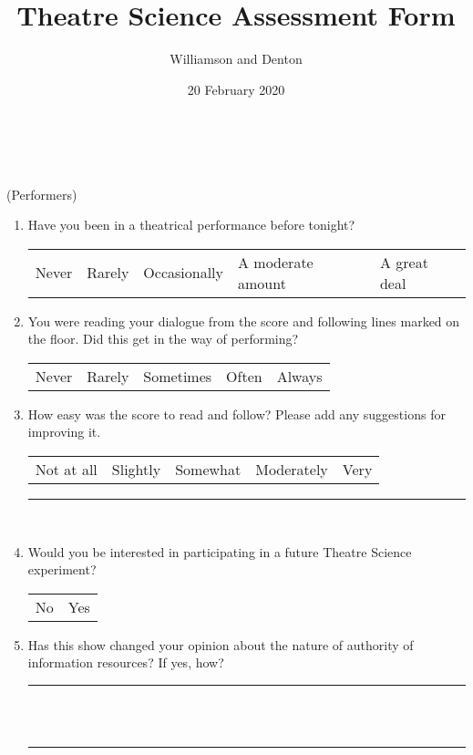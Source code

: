 \documentclass[12pt]{extarticle}
\title{Theatre Science Assessment Form}
\author{Williamson and Denton}
\date{20 February 2020}
\begin{document}
\thispagestyle{empty}

\begin{center}
  \\
  \vspace{0.3cm}
  \\
  \vspace{0.3cm}
  (Performers)
  \vspace{0.5cm}
\end{center}

\begin{enumerate}

  \item Have you been in a theatrical performance before tonight?

  \begin{tabular}{l|l|l|l|l}
    Never & Rarely & Occasionally & A moderate amount & A great deal
  \end{tabular}

  \item You were reading your dialogue from the score and following lines marked on the floor.  Did this get in the way of performing?

  \begin{tabular}{l|l|l|l|l}
    Never &  Rarely & Sometimes & Often & Always
  \end{tabular}

  \item How easy was the score to read and follow?  Please add any suggestions for improving it.

    \begin{tabular}{l|l|l|l|l}
    Not at all & Slightly & Somewhat & Moderately & Very
  \end{tabular}

  \vspace{0.5cm}
  \rule{6in}{1pt}\\

  \item Would you be interested in participating in a future Theatre Science experiment?

    \begin{tabular}{l|l}
    No & Yes
    \end{tabular}

  \item Has this show changed your opinion about the nature of authority of information resources?   If yes, how?

  \vspace{0.5cm}
  \rule{6in}{1pt}\\
  \vspace{0.5cm}\\
  \rule{6in}{1pt}


\end{enumerate}
\end{document}

